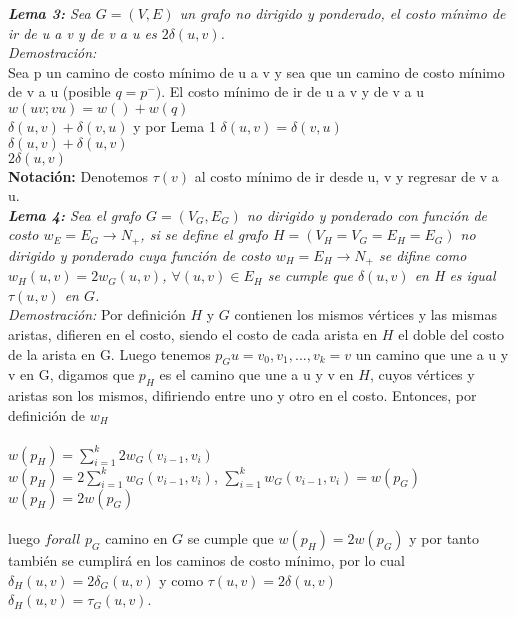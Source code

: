 \documentclass[12pt]{article}
\begin{document}
\textit{\textbf{Lema 3:} Sea $G = (V,E)$ un grafo no dirigido y ponderado, el costo m\'inimo de ir de u a v y de v a u es $2 \delta (u, v)$.}\\

\textit{Demostración:} \\
Sea p un camino de costo m\'inimo de u a v y sea que un camino de costo m\'inimo de v a u (posible $q = p^-)$.  El costo m\'inimo de ir de u a v y de v a u\\
        $w(uv;vu) = w() + w(q)$\\
                    $\delta (u,v) + \delta (v,u)$ y por Lema 1 $\delta (u,v) = \delta (v,u)$\\  
                    $\delta (u,v) + \delta (u, v)$\\
                    $2\delta (u,v)$\\

\textbf{Notaci\'on:} Denotemos $\tau(v)$ al costo m\'inimo de ir desde u, v y regresar de v a u.\\

\textit{\textbf{Lema 4:} Sea el grafo $G= (V_G, E_G)$ no dirigido y ponderado con funci\'on de costo 
$w_E = E_G  \rightarrow N_+$, si se define el grafo $H = (V_H = V_G = E_H = E_G)$
no dirigido y ponderado cuya funci\'on de costo $w_H = E_H \rightarrow N_+$ se difine como $w_H(u, v) = 2w_G(u, v)$, 
$\forall (u,v)\in E_H$ se cumple que
$\delta (u, v)$ en H es igual $\tau(u, v)$ en $G$.}\\

\textit{Demostraci\'on:} Por definici\'on $H$ y $G$ contienen los mismos v\'ertices y las mismas aristas, difieren en el costo, siendo el costo de cada arista en $H$ el doble
del costo de la arista en G.  Luego tenemos $p_G {u=v_0,v_1,...,v_k=v}$ un camino que une a u y v en G, digamos que $p_H$ es el camino que une a u y v en $H$,
 cuyos v\'ertices y aristas son los mismos, difiriendo entre uno y otro en el costo. Entonces, por definici\'on de $w_H$\\
 \\
                      $ w(p_H) = \sum\limits_{i=1}^{k}2w_G(v_{i-1},v_i)$\\
                           $w(p_H) = 2\sum\limits_{i=1}^{k}w_G(v_{i-1},v_i)$,   $\sum\limits_{i=1}^{k}w_G(v_{i-1},v_i) = w(p_G)$\\
                      $w(p_H) = 2w(p_G)$\\
                      \\
luego $forall$ $p_G$ camino en $G$ se cumple que $w(p_H)= 2w(p_G)$ y por tanto tambi\'en se cumplir\'a en los caminos de costo m\'inimo, por lo cual\\
                      $\delta_H (u,v) = 2\delta_G (u,v)$ y como $\tau(u,v) = 2\delta (u,v)$\\
                      $\delta_H (u,v) = \tau_G(u,v)$.\\
\\
\end{document}
